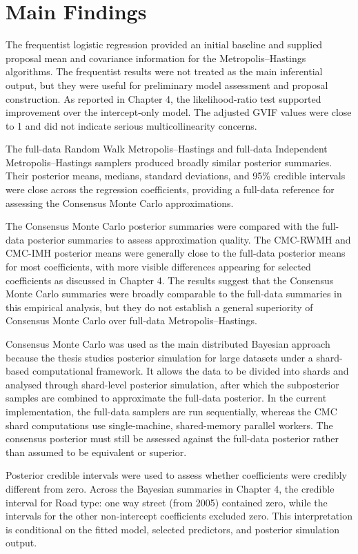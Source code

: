 \section{Main Findings}

The frequentist logistic regression provided an initial baseline and supplied proposal mean and covariance information for the Metropolis--Hastings algorithms. The frequentist results were not treated as the main inferential output, but they were useful for preliminary model assessment and proposal construction. As reported in Chapter 4, the likelihood-ratio test supported improvement over the intercept-only model. The adjusted GVIF values were close to 1 and did not indicate serious multicollinearity concerns.

The full-data Random Walk Metropolis--Hastings and full-data Independent Metropolis--Hastings samplers produced broadly similar posterior summaries. Their posterior means, medians, standard deviations, and 95\% credible intervals were close across the regression coefficients, providing a full-data reference for assessing the Consensus Monte Carlo approximations.

The Consensus Monte Carlo posterior summaries were compared with the full-data posterior summaries to assess approximation quality. The CMC-RWMH and CMC-IMH posterior means were generally close to the full-data posterior means for most coefficients, with more visible differences appearing for selected coefficients as discussed in Chapter 4. The results suggest that the Consensus Monte Carlo summaries were broadly comparable to the full-data summaries in this empirical analysis, but they do not establish a general superiority of Consensus Monte Carlo over full-data Metropolis--Hastings.

Consensus Monte Carlo was used as the main distributed Bayesian approach because the thesis studies posterior simulation for large datasets under a shard-based computational framework. It allows the data to be divided into shards and analysed through shard-level posterior simulation, after which the subposterior samples are combined to approximate the full-data posterior. In the current implementation, the full-data samplers are run sequentially, whereas the CMC shard computations use single-machine, shared-memory parallel workers. The consensus posterior must still be assessed against the full-data posterior rather than assumed to be equivalent or superior.

Posterior credible intervals were used to assess whether coefficients were credibly different from zero. Across the Bayesian summaries in Chapter 4, the credible interval for Road type: one way street (from 2005) contained zero, while the intervals for the other non-intercept coefficients excluded zero. This interpretation is conditional on the fitted model, selected predictors, and posterior simulation output.

